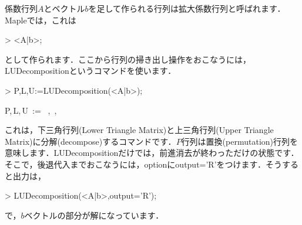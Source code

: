 係数行列$A$とベクトル$b$を足して作られる行列は拡大係数行列と呼ばれます．Mapleでは，これは
\begin{MapleInput}
> <A|b>;
\end{MapleInput}
\begin{MapleOutput}
\end{MapleOutput}
として作られます．ここから行列の掃き出し操作をおこなうには，LUDecompositionというコマンドを使います．
\begin{MapleInput}
> P,L,U:=LUDecomposition(<A|b>);
\end{MapleInput}
\begin{MapleOutput}
P,\,L,\,U\, := \, \left[ \begin {array}{cc} 1&0\\ 0&1\end {array} \right] ,\, \left[ \begin {array}{cc} 1&0\\ 2&1\end {array} \right] ,\, 
\end{MapleOutput}
これは，下三角行列(Lower Triangle Matrix)と上三角行列(Upper Triangle Matrix)に分解(decompose)するコマンドです．$P$行列は置換(permutation)行列を意味します．LUDecompositionだけでは，前進消去が終わっただけの状態です．そこで，後退代入までおこなうには，optionにoutput='R'をつけます．そうすると出力は，
\begin{MapleInput}
> LUDecomposition(<A|b>,output='R');
\end{MapleInput}
\begin{MapleOutput}
\end{MapleOutput}
で，$b$ベクトルの部分が解になっています．
